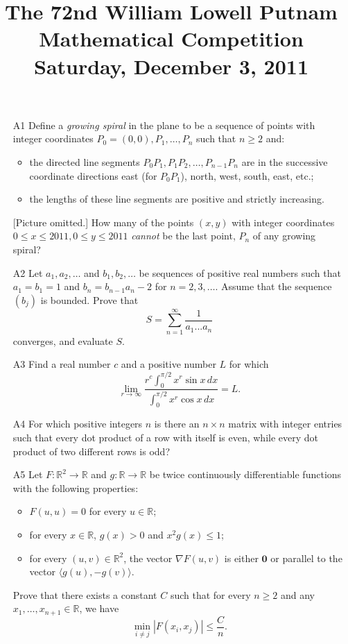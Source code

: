 \documentclass[amssymb,twocolumn,pra,10pt,aps]{revtex4-1}
\begin{document}
\title{The 72nd William Lowell Putnam Mathematical Competition \\
    Saturday, December 3, 2011}
\maketitle

\newcommand{\RR}{\mathbb{R}}

\begin{itemize}

\item[A1] Define a \textit{growing spiral} in the plane to be a sequence
of points with integer coordinates $P_0 = (0,0), P_1, \dots, P_n$ such
that $n \geq 2$ and:
\begin{itemize}
\item the directed line segments $P_0 P_1, P_1 P_2, \dots, P_{n-1} P_n$
are in the successive coordinate directions east (for $P_0 P_1$), north,
west, south, east, etc.;
\item the lengths of these line segments are positive and strictly
increasing.
\end{itemize} [Picture omitted.]  How many of the points $(x,y)$ with
integer coordinates $0\leq x\leq 2011, 0\leq y\leq 2011$ \emph{cannot}
be the last point, $P_n$ of any growing spiral?

\item[A2] Let $a_1,a_2,\dots$ and $b_1,b_2,\dots$ be sequences of positive
real numbers such that $a_1 = b_1 = 1$ and $b_n = b_{n-1} a_n - 2$ for
$n=2,3,\dots$. Assume that the sequence $(b_j)$ is bounded. Prove that
\[
S = \sum_{n=1}^\infty \frac{1}{a_1...a_n}
\]
converges, and evaluate $S$.

\item[A3] Find a real number $c$ and a positive number $L$ for which
\[
\lim_{r\to\infty} \frac{r^c \int_0^{\pi/2} x^r \sin x \,dx}{\int_0^{\pi/2} x^r \cos x \,dx} = L.
\]

\item[A4] For which positive integers $n$ is there an $n \times n$ matrix
with integer entries such that every dot product of a row with itself is
even, while every dot product of two different rows is odd?

\item[A5] Let $F : \RR^2 \to \RR$ and $g : \RR \to \RR$ be twice
continuously differentiable functions with the following properties:
\begin{itemize}
\item $F(u,u) = 0$ for every $u \in \RR$;
\item for every $x \in \RR$, $g(x) > 0$ and $x^2 g(x) \leq 1$;
\item for every $(u,v) \in \RR^2$, the vector $\nabla F(u,v)$ is either $\mathbf{0}$ or parallel to the vector $\langle g(u), -g(v) \rangle$.
\end{itemize}
Prove that there exists a constant $C$ such that for every $n\geq 2$ and any $x_1,\dots,x_{n+1} \in \RR$, we have
\[
\min_{i \neq j} |F(x_i,x_j)| \leq \frac{C}{n}.
\]


\end{itemize}
\end{document}
